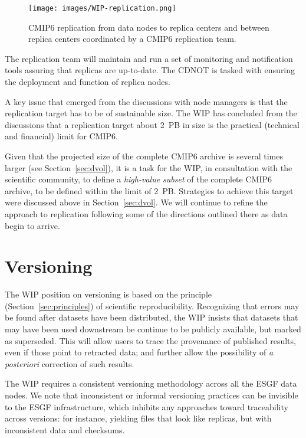 \documentclass[gmd,manuscript]{copernicus}
\newcommand{\secref}[1] {\mbox{Section  \ref{sec:#1}}}
\begin{document}
\begin{figure*}
  \begin{center}
    \texttt{[image: images/WIP-replication.png]}
  \end{center}
  \caption{CMIP6 replication from data nodes to replica centers and
    between replica centers coordinated by a CMIP6 replication team.}
  \label{fig:replica}
\end{figure*}

The replication team will maintain and run a set of monitoring and
notification tools assuring that replicas are up-to-date. The CDNOT is
tasked with ensuring the deployment and function of replica nodes.

A key issue that emerged from the discussions with node managers is
that the replication target has to be of sustainable size. The WIP has
concluded from the discussions that a replication target about 2~PB in
size is the practical (technical and financial) limit for CMIP6.


Given that the projected size of the complete CMIP6 archive is several
times larger (see \secref{dvol}), it is a task for the WIP, in
consultation with the scientific community, to define a
\emph{high-value subset} of the complete CMIP6 archive, to be defined
within the limit of 2~PB. Strategies to achieve this target were
discussed above in \secref{dvol}. We will continue to refine the
approach to replication following some of the directions outlined
there as data begin to arrive.

\section{Versioning}
\label{sec:version}


The WIP position on versioning is based on the principle
(\secref{principles}) of scientific reproducibility. Recognizing that
errors may be found after datasets have been distributed, the WIP
insists that datasets that may have been used downstream be continue
to be publicly available, but marked as superseded. This will allow
users to trace the provenance of published results, even if those
point to retracted data; and further allow the possibility of \emph{a
  posteriori} correction of such results.

The WIP requires a consistent versioning methodology across all the
ESGF data nodes. We note that inconsistent or informal versioning
practices can be invisible to the ESGF infrastructure, which inhibits
any approaches toward traceability across versions: for instance,
yielding files that look like replicas, but with inconsistent data and
checksums.
\end{document}
